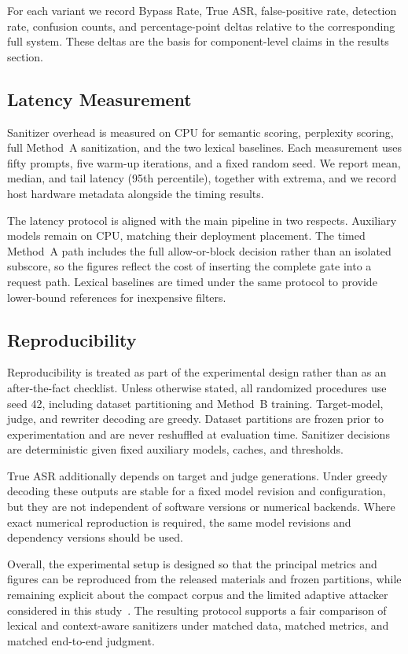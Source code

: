 \documentclass{article}
\begin{document}
For each variant we record Bypass Rate, True ASR, false-positive rate, detection rate, confusion counts, and percentage-point deltas relative to the corresponding full system.
These deltas are the basis for component-level claims in the results section.

\subsection{Latency Measurement}
\label{sec:latency-setup}

Sanitizer overhead is measured on CPU for semantic scoring, perplexity scoring, full Method~A sanitization, and the two lexical baselines.
Each measurement uses fifty prompts, five warm-up iterations, and a fixed random seed.
We report mean, median, and tail latency (95th percentile), together with extrema, and we record host hardware metadata alongside the timing results.

The latency protocol is aligned with the main pipeline in two respects.
Auxiliary models remain on CPU, matching their deployment placement.
The timed Method~A path includes the full allow-or-block decision rather than an isolated subscore, so the figures reflect the cost of inserting the complete gate into a request path.
Lexical baselines are timed under the same protocol to provide lower-bound references for inexpensive filters.

\subsection{Reproducibility}
\label{sec:repro-setup}

Reproducibility is treated as part of the experimental design rather than as an after-the-fact checklist.
Unless otherwise stated, all randomized procedures use seed 42, including dataset partitioning and Method~B training.
Target-model, judge, and rewriter decoding are greedy.
Dataset partitions are frozen prior to experimentation and are never reshuffled at evaluation time.
Sanitizer decisions are deterministic given fixed auxiliary models, caches, and thresholds.

True ASR additionally depends on target and judge generations.
Under greedy decoding these outputs are stable for a fixed model revision and configuration, but they are not independent of software versions or numerical backends.
Where exact numerical reproduction is required, the same model revisions and dependency versions should be used.

Overall, the experimental setup is designed so that the principal metrics and figures can be reproduced from the released materials and frozen partitions, while remaining explicit about the compact corpus and the limited adaptive attacker considered in this study~\cite{owasp_llm,zizzo2025adversarial}.
The resulting protocol supports a fair comparison of lexical and context-aware sanitizers under matched data, matched metrics, and matched end-to-end judgment.
\end{document}
